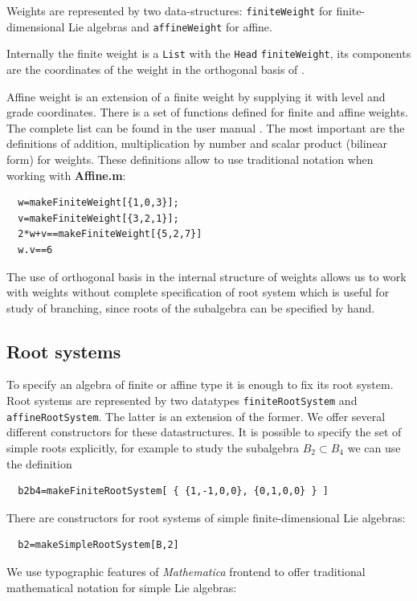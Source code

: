 \documentclass[preprint,12pt]{elsarticle}
\begin{document}
Weights are represented  by two data-structures: \lstinline{finiteWeight} for finite-dimensional Lie algebras and \lstinline{affineWeight}  for affine. 

Internally the finite weight is a \lstinline{List} with the
\lstinline{Head} \lstinline{finiteWeight}, its components are the
coordinates of the weight in the orthogonal basis of
\cite{bourbaki2002lie}.

Affine weight is an extension of a finite weight by supplying it
with level and grade coordinates. There is a set of functions
defined for finite and affine weights. The complete list can be
found in the user manual \cite{affinemanual}. The most important
are the definitions of addition, multiplication by number and
scalar product (bilinear form) for weights. These definitions
allow to use traditional notation when working with {\bf
Affine.m}:
\begin{lstlisting}
  w=makeFiniteWeight[{1,0,3}];
  v=makeFiniteWeight[{3,2,1}];
  2*w+v==makeFiniteWeight[{5,2,7}]
  w.v==6
\end{lstlisting}

The use of orthogonal basis in the internal structure of weights allows us to work with weights without complete specification of root system which is useful for study of branching, since roots of the subalgebra can be specified by hand.

\subsection{Root systems}
\label{sec:root-systems}

To specify an algebra of finite or affine type it is enough to fix 
its root system. Root systems are represented by two datatypes
\lstinline{finiteRootSystem} and \lstinline{affineRootSystem}. The
latter is an extension of the former. We offer several different
constructors for these datastructures. It is possible to specify
the set of simple roots explicitly, for example to study the
subalgebra $B_2\subset B_4$ we can use the definition
\begin{lstlisting}
  b2b4=makeFiniteRootSystem[ { {1,-1,0,0}, {0,1,0,0} } ]
\end{lstlisting}
There are constructors for root systems of simple finite-dimensional Lie algebras:
\begin{lstlisting}
  b2=makeSimpleRootSystem[B,2]
\end{lstlisting}
We use typographic features of {\it Mathematica} frontend to offer traditional mathematical notation for simple Lie algebras:
\end{document}
